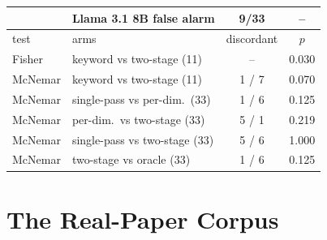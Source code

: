 \begin{table}[t]
{\begin{tabular}{llcc}
             & Llama 3.1 8B false alarm & 9/33 & -- \\
    \midrule
    \rowcolor{tablehead} test & arms & discordant & $p$ \\
    \midrule
    Fisher & keyword vs two-stage (11) & -- & 0.030 \\
    McNemar & keyword vs two-stage (11) & 1 / 7 & 0.070 \\
    McNemar & single-pass vs per-dim.\ (33) & 1 / 6 & 0.125 \\
    McNemar & per-dim.\ vs two-stage (33) & 5 / 1 & 0.219 \\
    McNemar & single-pass vs two-stage (33) & 5 / 6 & 1.000 \\
    McNemar & two-stage vs oracle (33) & 1 / 6 & 0.125 \\
    \bottomrule
  \end{tabular}}
\end{table}

\begin{table}[t]
  \centering\small
  \caption{Cell-bootstrap 95\% intervals for agreement with the reconciled
  gold (answered cells only; quadratic-weighted $\kappa$; 5,000 resamples).
  Rule~1 is the weak-retrieval rule; rules~1--4 add the three single-cell rules
  of Appendix~\ref{app:supp}. Resampling cells ignores their nesting in five
  papers and may understate uncertainty.}
  \label{tab:ci_gold}
  \setlength{\tabcolsep}{4pt}
\end{table}

\section{The Real-Paper Corpus}
\label{app:corpus}


